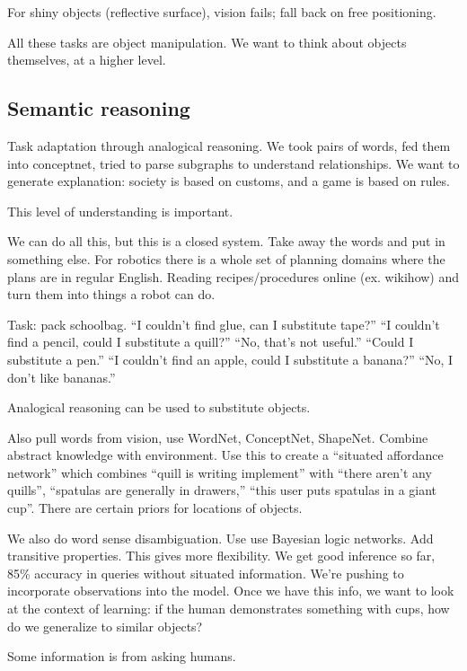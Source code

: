 For shiny objects (reflective surface), vision fails; fall back on free positioning.

All these tasks are object manipulation. We want to think about objects themselves, at a higher level.

\subsection{Semantic reasoning}

Task adaptation through analogical reasoning. We took pairs of words, fed them into conceptnet, tried to parse subgraphs to understand relationships. 
We want to generate explanation: society is based on customs, and a game is based on rules.

This level of understanding is important.

We can do all this, but this is a closed system. Take away the words and put in something else. For robotics there is a whole set of planning domains where the plans are in regular English. 
Reading recipes/procedures online (ex. wikihow) and turn them into things a robot can do.

Task: pack schoolbag. ``I couldn't find glue, can I substitute tape?''
``I couldn't find a pencil, could I substitute a quill?'' ``No, that's not useful.'' ``Could I substitute a pen.'' ``I couldn't find an apple, could I substitute a banana?'' ``No, I don't like bananas.''

Analogical reasoning can be used to substitute objects.

Also pull words from vision, use WordNet, ConceptNet, ShapeNet. Combine abstract knowledge with environment. Use this to create a ``situated affordance network'' which combines ``quill is writing implement'' with ``there aren't any quills'', ``spatulas are generally in drawers,'' ``this user puts spatulas in a giant cup''.
There are certain priors for locations of objects.

We also do word sense disambiguation. Use use Bayesian logic networks. Add transitive properties. This gives more flexibility.
We get good inference so far, 85\% accuracy in queries without situated information. We're pushing to incorporate observations into the model.
Once we have this info, we want to look at the context of learning: if the human demonstrates something with cups, how do we generalize to similar objects?

Some information is from asking humans.

